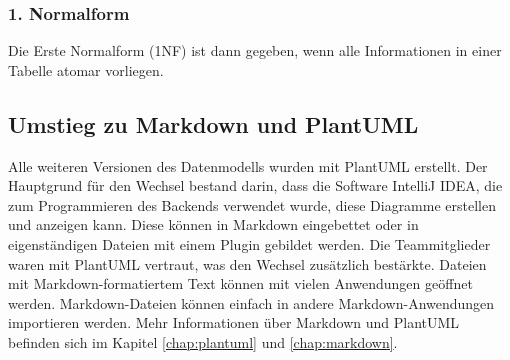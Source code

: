 \subsubsection{1. Normalform}
Die Erste Normalform (1NF) ist dann gegeben, wenn alle Informationen in einer Tabelle atomar vorliegen. \cite{noauthor_erste_nodate}

\subsection{Umstieg zu Markdown und PlantUML}
Alle weiteren Versionen des Datenmodells wurden mit PlantUML erstellt. Der Hauptgrund für den 
Wechsel bestand darin, dass die Software IntelliJ IDEA, die zum Programmieren des 
Backends verwendet wurde, diese Diagramme erstellen und anzeigen kann.
Diese können in Markdown eingebettet oder in eigenständigen Dateien mit einem Plugin gebildet werden. 
Die Teammitglieder waren mit PlantUML vertraut, was den Wechsel zusätzlich bestärkte.
\newline
\newline
Dateien mit Markdown-formatiertem Text können mit vielen Anwendungen geöffnet werden. 
Markdown-Dateien können einfach in andere Markdown-Anwendungen importieren werden.
Mehr Informationen über Markdown und PlantUML befinden sich im Kapitel \ref{chap:plantuml} und \ref{chap:markdown}.

